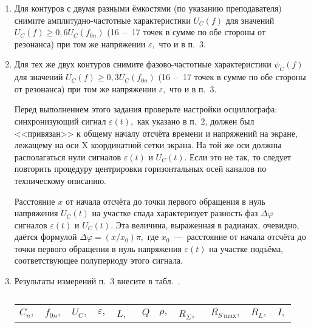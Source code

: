\begin{lab:task}
\begin{enumerate}
    \item Для контуров с двумя разными ёмкостями (по указанию преподавателя) снимите амплитудно-частотные характеристики $U_C(f)$ для значений $U_C(f)\ge0,6U_C(f_{0n})$ (16~--~17 точек в сумме по обе стороны от резонанса) при том же напряжении $\varepsilon,$ что и в п.~3.
    
    \item Для тех же двух контуров снимите фазово-частотные характеристики $\psi_C(f)$ для значений $U_C(f)\ge0,3U_C(f_{0n})$ (16~--~17 точек в сумме по обе стороны от резонанса) при том же напряжении $\varepsilon,$ что и в п.~3.

		    Перед выполнением этого задания проверьте настройки осциллографа: синхронизующий сигнал $\varepsilon(t),$ как указано в п.~2, должен был <<привязан>> к общему началу отсчёта времени и напряжений на экране, лежащему на оси X координатной сетки экрана. На той же оси должны располагаться нули сигналов $\varepsilon(t)$ и $U_C(t).$ Если это не так, то следует повторить процедуру центрировки горизонтальных осей каналов по техническому описанию.
		
		    Расстояние $x$ от начала отсчёта до точки первого обращения в нуль напряжения $U_C(t)$ на участке спада характеризует разность фаз $\Delta\varphi$ сигналов $\varepsilon(t)$ и $U_C(t).$ Эта величина, выраженная в радианах, очевидно, даётся формулой $\Delta\varphi=(x/x_0)\pi,$ где $x_0$~---~расстояние от начала отсчёта до точки первого обращения в нуль напряжения $\varepsilon(t)$ на участке подъёма, соответствующее полупериоду этого сигнала.
		
		
		    \item Результаты измерений п.~3 внесите в табл.~.
		    \begin{center}
		        \begin{table}[tb!]
		            \caption{}
		            \begin{center}
		                \begin{tabular}{|c|c|c|c|c|c|c|c|c|c|c|}
		                    \hline
		                    $C_n,$ & $f_{0n},$& $U_C,$& $\varepsilon,$ & $L,$~& $Q$& $\rho,$ & $R_{\Sigma},$~& $R_{S~\text{max}},$& $R_L,$& $I,$\\
		

\end{tabular}
\end{center}
\end{table}
\end{center}
\end{enumerate}
\end{lab:task}
